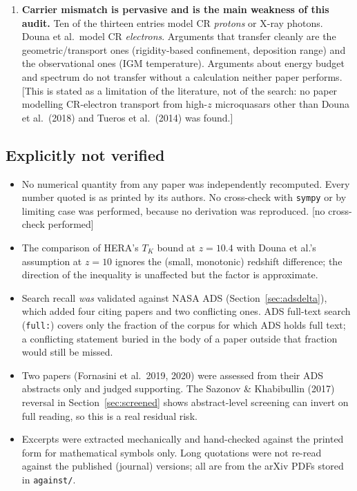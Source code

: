 \documentclass[11pt,a4paper]{article}
\newcommand{\flag}[1]{\textcolor{orange!75!black}{\textsf{\small [#1]}}}
\begin{document}
\begin{enumerate}[leftmargin=*,itemsep=4pt]
\item \textbf{Carrier mismatch is pervasive and is the main weakness of this
      audit.} Ten of the thirteen entries model CR \emph{protons} or X-ray
      photons. Douna et al.\ model CR \emph{electrons}. Arguments that transfer
      cleanly are the geometric/transport ones (rigidity-based confinement,
      deposition range) and the observational ones (IGM temperature). Arguments
      about energy budget and spectrum do not transfer without a calculation
      neither paper performs. \flag{This is stated as a limitation of the
      literature, not of the search: no paper modelling CR-electron transport
      from high-$z$ microquasars other than Douna et al.\ (2018) and Tueros et
      al.\ (2014) was found.}
\end{enumerate}

\subsection{Explicitly not verified}

\begin{itemize}[leftmargin=*,itemsep=2pt]
\item No numerical quantity from any paper was independently recomputed. Every
      number quoted is as printed by its authors. No cross-check with
      \texttt{sympy} or by limiting case was performed, because no derivation
      was reproduced. \flag{no cross-check performed}
\item The comparison of HERA's $T_K$ bound at $z=10.4$ with Douna et al.'s
      assumption at $z=10$ ignores the (small, monotonic) redshift difference;
      the direction of the inequality is unaffected but the factor is
      approximate.
\item Search recall \emph{was} validated against NASA ADS (Section~\ref{sec:adsdelta}),
      which added four citing papers and two conflicting ones. ADS full-text
      search (\texttt{full:}) covers only the fraction of the corpus for which
      ADS holds full text; a conflicting statement buried in the body of a paper
      outside that fraction would still be missed.
\item Two papers (Fornasini et al.\ 2019, 2020) were assessed from their ADS
      abstracts only and judged supporting. The Sazonov \& Khabibullin (2017)
      reversal in Section~\ref{sec:screened} shows abstract-level screening can
      invert on full reading, so this is a real residual risk.
\item Excerpts were extracted mechanically and hand-checked against the printed
      form for mathematical symbols only. Long quotations were not re-read
      against the published (journal) versions; all are from the arXiv PDFs
      stored in \texttt{against/}.
\end{itemize}
\end{document}
